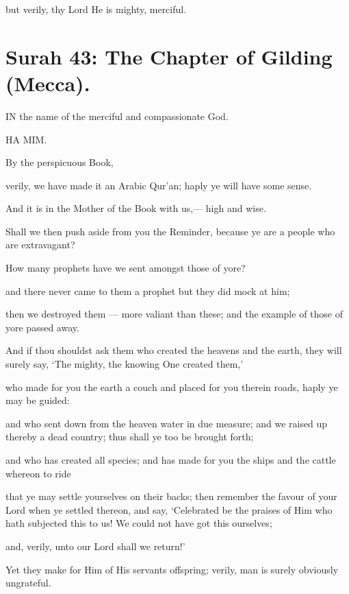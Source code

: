 \documentclass[fontsize=14pt, letterpaper, notitlepage, openany, DIV=12]{scrbook} %
\begin{document}
\noindent[26:159]
but verily, thy Lord He is mighty, merciful.


\section{Surah 43: The Chapter of Gilding (Mecca).}


IN the name of the merciful and compassionate God.

\noindent[43:1]
HA MIM.

\noindent[43:2]
By the perspicuous Book,

\noindent[43:3]
verily, we have made it an Arabic Qur'an; haply ye will have some sense.

\noindent[43:4]
And it is in the Mother of the Book with us,--- high and wise.

\noindent[43:5]
Shall we then push aside from you the Reminder, because ye are a people who are
extravagant?

\noindent[43:6]
How many prophets have we sent amongst those of yore?

\noindent[43:7]
and there never came to them a prophet but they did mock at him;

\noindent[43:8]
then we destroyed them --- more valiant than these; and the example of those of yore
passed away.

\noindent[43:9]
And if thou shouldst ask them who created the heavens and the earth, they will surely
say, `The mighty, the knowing One created them,'

\noindent[43:10]
who made for you the earth a couch and placed for you therein roads, haply ye may be
guided:

\noindent[43:11]
and who sent down from the heaven water in due measure; and we raised up thereby a
dead country; thus shall ye too be brought forth;

\noindent[43:12]
and who has created all species; and has made for you the ships and the cattle whereon to
ride

\noindent[43:13]
that ye may settle yourselves on their backs; then remember the favour of your Lord
when ye settled thereon, and say, `Celebrated be the praises of Him who hath subjected this to
us! We could not have got this ourselves;

\noindent[43:14]
and, verily, unto our Lord shall we return!'

\noindent[43:15]
Yet they make for Him of His servants offspring; verily, man is surely obviously
ungrateful.
\end{document}
